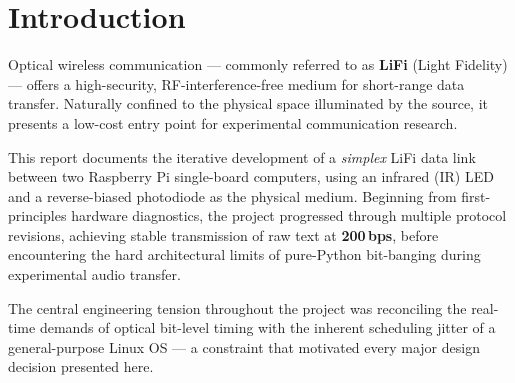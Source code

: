 \documentclass[10pt, twocolumn, a4paper]{article}
\begin{document}

\section{Introduction}

Optical wireless communication — commonly referred to as \textbf{LiFi} (Light Fidelity) — offers a high-security, RF-interference-free medium for short-range data transfer. Naturally confined to the physical space illuminated by the source, it presents a low-cost entry point for experimental communication research.

This report documents the iterative development of a \textit{simplex} LiFi data link between two Raspberry Pi single-board computers, using an infrared (IR) LED and a reverse-biased photodiode as the physical medium. Beginning from first-principles hardware diagnostics, the project progressed through multiple protocol revisions, achieving stable transmission of raw text at \textbf{200\,bps}, before encountering the hard architectural limits of pure-Python bit-banging during experimental audio transfer.

The central engineering tension throughout the project was reconciling the real-time demands of optical bit-level timing with the inherent scheduling jitter of a general-purpose Linux OS — a constraint that motivated every major design decision presented here.
\end{document}
